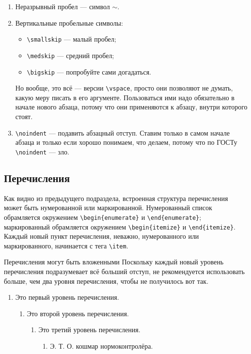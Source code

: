 \documentclass[14pt, russian]{scrartcl}
\begin{document}
\begin{enumerate}
\begin{itemize}
\item \texttt{\textbackslash qquad} --- два больших пробела  (см. бла\qquad бла).
\end{itemize}
\item Неразрывный пробел --- символ $\sim$.
\item Вертикальные пробельные символы:
\begin{itemize}
\item \texttt{\textbackslash smallskip} --- малый пробел;
\item \texttt{\textbackslash medskip} --- средний пробел;
\item \texttt{\textbackslash bigskip} --- попробуйте сами догадаться.
\end{itemize} 
Но вообще, это всё --- версии \texttt{\textbackslash vspace}, просто они позволяют не думать, какую меру писать в его аргументе. Пользоваться ими надо обязательно в начале нового абзаца, потому что они применяются к абзацу, внутри которого стоят. 
\item \texttt{\textbackslash noindent} --- подавить абзацный отступ. Ставим только в самом начале абзаца и только если хорошо понимаем, что делаем, потому что по ГОСТу \texttt{\textbackslash noindent} --- зло.
\end{enumerate}

\subsection{Перечисления}

Как видно из предыдущего подраздела, встроенная структура перечисления может быть нумерованной или маркированной. Нумерованный список обрамляется окружением \texttt{\textbackslash begin\{enumerate\}} и \texttt{\textbackslash end\{enumerate\}}; маркированный обрамляется окружением \texttt{\textbackslash begin\{itemize\}} и \texttt{\textbackslash end\{itemize\}}. Каждый новый пункт перечисления, неважно, нумерованного или маркированного, начинается с тега \texttt{\textbackslash item}. 

Перечисления могут быть вложенными Поскольку каждый новый уровень перечисления подразумевает всё больший отступ, не рекомендуется использовать больше, чем два уровня перечисления, чтобы не получилось вот так.

\begin{enumerate}
\item Это первый уровень перечисления.
\begin{enumerate}
\item Это второй уровень перечисления.
\begin{enumerate}
\item Это третий уровень перечисления.
\begin{enumerate}
\item Э. Т. О. кошмар нормоконтролёра.
\end{enumerate}
\end{enumerate}
\end{enumerate}
\end{enumerate}
\end{document}
